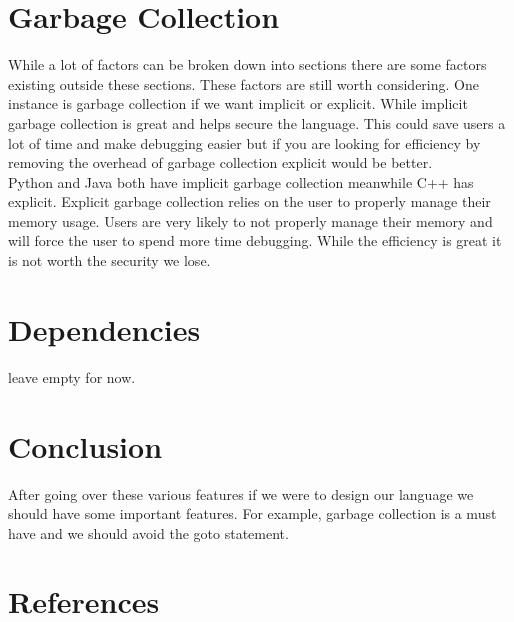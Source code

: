 \documentclass[sigconf, nonacm, authorversion, language=english, 12pt]{acmart}
\def\tab{\hspace*{5mm}}
\begin{document}
\section{Garbage Collection}

\tab While a lot of factors can be broken down into sections there are some factors existing outside these sections. These
factors are still worth considering. One instance is garbage collection if we want implicit or explicit. While implicit
garbage collection is great and helps secure the language. This could save users a lot of time and make debugging easier
but if you are looking for efficiency by removing the overhead of garbage collection explicit would be better.\\

\tab Python and Java both have implicit garbage collection meanwhile C++ has explicit. Explicit garbage collection relies on
the user to properly manage their memory usage. Users are very likely to not properly manage their memory and will
force the user to spend more time debugging. While the efficiency is great it is not worth the security we lose.\\

\section{Dependencies}
leave empty for now.


\section{Conclusion}
After going over these various features if we were to design our language we should have some important features. For example, garbage collection is a must have and we should avoid
the goto statement.

\section*{References}
\end{document}
